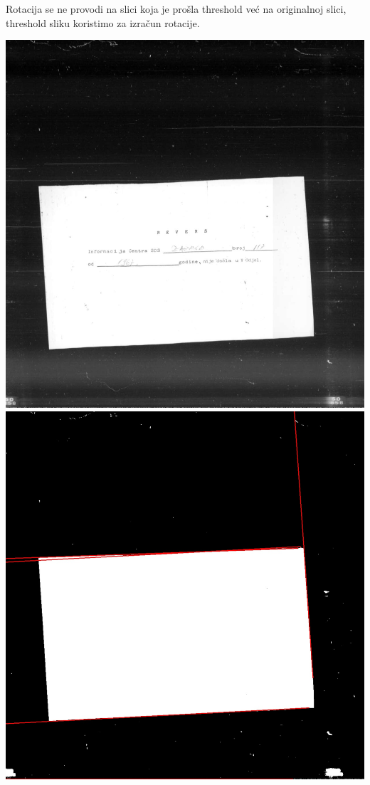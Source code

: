 \documentclass{article}
\begin{document}
Rotacija se ne provodi na slici koja je prošla threshold već na originalnoj slici, threshold sliku koristimo za izračun rotacije.
\begin{center}
    \includegraphics[scale=0.415]{Z05353721.jpg}
    \includegraphics[scale=0.1]{Z05353721_draw.jpg}

\end{center}
\end{document}
